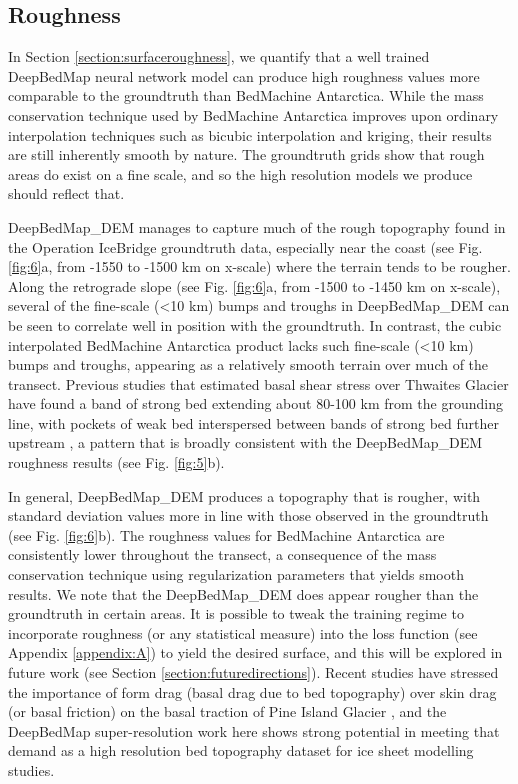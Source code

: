 \documentclass[tc, manuscript]{copernicus}
\begin{document}
\subsection{Roughness}

In Section \ref{section:surfaceroughness}, we quantify that a well trained DeepBedMap neural network model can produce high roughness values more comparable to the groundtruth than BedMachine Antarctica.
While the mass conservation technique used by BedMachine Antarctica \citep{MorlighemDeepglacialtroughs2019} improves upon ordinary interpolation techniques such as bicubic interpolation and kriging, their results are still inherently smooth by nature.
The groundtruth grids show that rough areas do exist on a fine scale, and so the high resolution models we produce should reflect that.

DeepBedMap\_DEM manages to capture much of the rough topography found in the Operation IceBridge groundtruth data, especially near the coast (see Fig. \ref{fig:6}a, from -1550 to -1500 km on x-scale) where the terrain tends to be rougher.
Along the retrograde slope (see Fig. \ref{fig:6}a, from -1500 to -1450 km on x-scale), several of the fine-scale (<10 km) bumps and troughs in DeepBedMap\_DEM can be seen to correlate well in position with the groundtruth.
In contrast, the cubic interpolated BedMachine Antarctica product lacks such fine-scale (<10 km) bumps and troughs, appearing as a relatively smooth terrain over much of the transect.
Previous studies that estimated basal shear stress over Thwaites Glacier have found a band of strong bed extending about 80-100 km from the grounding line, with pockets of weak bed interspersed between bands of strong bed further upstream \citep{JoughinBasalconditionsPine2009,SergienkoRegularPatternsFrictional2013}, a pattern that is broadly consistent with the DeepBedMap\_DEM roughness results (see Fig. \ref{fig:5}b).

In general, DeepBedMap\_DEM produces a topography that is rougher, with standard deviation values more in line with those observed in the groundtruth (see Fig. \ref{fig:6}b).
The roughness values for BedMachine Antarctica are consistently lower throughout the transect, a consequence of the mass conservation technique using regularization parameters that yields smooth results.
We note that the DeepBedMap\_DEM does appear rougher than the groundtruth in certain areas.
It is possible to tweak the training regime to incorporate roughness (or any statistical measure) into the loss function (see Appendix \ref{appendix:A}) to yield the desired surface, and this will be explored in future work (see Section \ref{section:futuredirections}).
Recent studies have stressed the importance of form drag (basal drag due to bed topography) over skin drag (or basal friction) on the basal traction of Pine Island Glacier \citep{BinghamDiverselandscapesPine2017,Kyrke-SmithRelevanceDetailBasal2018}, and the DeepBedMap super-resolution work here shows strong potential in meeting that demand as a high resolution bed topography dataset for ice sheet modelling studies.
\end{document}
